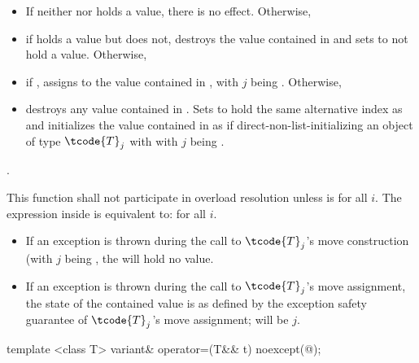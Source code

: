 \begin{itemdescr}
\pnum
\effects
\begin{itemize}
\item
If neither  nor  holds a value, there is no effect. Otherwise,
\item
if  holds a value but  does not, destroys the value
contained in  and sets  to not hold a value. Otherwise,
\item
if , assigns  to
the value contained in , with $j$ being . Otherwise,
\item
destroys any value contained in . Sets  to hold the
same alternative index as  and initializes the value contained in
 as if direct-non-list-initializing an object of type $\tcode{T}_j$
with  with $j$ being .
\end{itemize}

\pnum
\returns {}.

\pnum
\remarks
This function shall not participate in overload resolution unless
 is
 for all $i$.
The expression inside  is equivalent to:
 for all $i$.
\begin{itemize}
\item If an exception is thrown during the call to $\tcode{T}_j$'s move construction
(with $j$ being , the  will hold no value.
\item If an exception is thrown during the call to $\tcode{T}_j$'s move assignment,
the state of the contained value is as defined by the exception safety
guarantee of $\tcode{T}_j$'s move assignment;  will be $j$.
\end{itemize}
\end{itemdescr}

%
\begin{itemdecl}
template <class T> variant& operator=(T&& t) noexcept(@\seebelow@);
\end{itemdecl}


